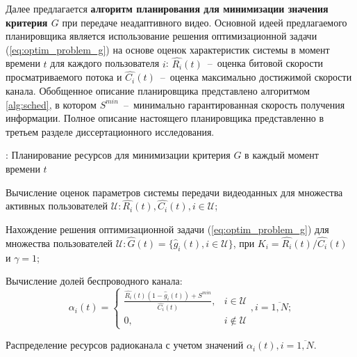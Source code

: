 Далее предлагается \textbf{алгоритм планирования для минимизации значения критерия $G$} при передаче неадаптивного видео. Основной идеей предлагаемого планировщика является использование решения оптимизационной задачи (\ref{eq:optim_problem_g}) на основе оценок характеристик системы в момент времени $t$ для каждого пользователя $i$: $\hat{R_i}(t)$~--~оценка битовой скорости просматриваемого потока и $\hat{C_i}(t)$~--~оценка максимально достижимой скорости канала.
Обобщенное описание планировщика представлено алгоритмом \ref{alg:sched}, в котором $S^{min}$~--~минимально гарантированная скорость получения информации. Полное описание настоящего планировщика представленно в третьем разделе диссертационного исследования.
\begin{algorithm}
  \caption{: Планирование ресурсов для минимизации критерия $G$ в каждый момент времени $t$}
	\label{alg:sched}
  \begin{algorithmic}[1]
	\item Вычисление оценок параметров системы передачи видеоданных для множества активных пользователей $\mathcal{U}: \hat{R_i}(t), \hat{C_i}(t), i \in \mathcal{U}$;
	\item Нахождение решения оптимизационной задачи (\ref{eq:optim_problem_g}) для множества пользователей $\mathcal{U}:\hat{G}(t) = \{\hat{g}_i(t), i \in \mathcal{U}\}$, при $K_i = \hat{R_i}(t) / \hat{C_i}(t)$ и $\gamma = 1$;
	\item Вычисление долей беспроводного канала:$$\alpha_i(t) = \begin{cases}
					\frac{\hat{R_i}(t) (1 - \hat{g}_i(t)) + S^{min}}{\hat{C_i}(t)}, & i \in \mathcal{U} \\
					0, & i \notin \mathcal{U}
					\end{cases}, i = \overline{1,N};$$
	\item Распределение ресурсов радиоканала с учетом значений $\alpha_i(t), i = \overline{1,N}$.
  \end{algorithmic}
\end{algorithm}

